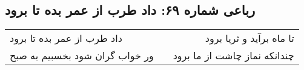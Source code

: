 \begin{center}
\section*{رباعی شماره ۶۹: داد طرب از عمر بده تا برود}
\label{sec:069}
\begin{longtable}{l p{0.5cm} r}
داد طرب از عمر بده تا برود
&&
تا ماه برآید و ثریا برود
\\
ور خواب گران شود بخسبیم به صبح
&&
چندانکه نماز چاشت از ما برود
\\
\end{longtable}
\end{center}
